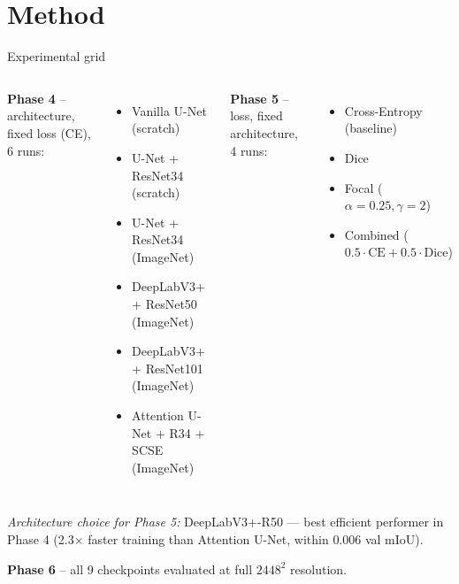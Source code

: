 \documentclass[aspectratio=169,12pt,xcolor={table}]{beamer}
\begin{document}
\section{Method}

\begin{frame}{Experimental grid}
  \footnotesize
  \begin{columns}[T]
  \textbf{Phase 4} -- architecture, fixed loss (CE), 6 runs:
  \begin{itemize}
    \setlength{\itemsep}{0.15em}
    \item Vanilla U-Net (scratch)
    \item U-Net + ResNet34 (scratch)
    \item U-Net + ResNet34 (ImageNet)
    \item DeepLabV3+ + ResNet50 (ImageNet)
    \item DeepLabV3+ + ResNet101 (ImageNet)
    \item Attention U-Net + R34 + SCSE (ImageNet)
  \end{itemize}

  \textbf{Phase 5} -- loss, fixed architecture, 4 runs:
  \begin{itemize}
    \setlength{\itemsep}{0.15em}
    \item Cross-Entropy (baseline)
    \item Dice
    \item Focal ($\alpha{=}0.25,\gamma{=}2$)
    \item Combined ($0.5\cdot\text{CE} + 0.5\cdot\text{Dice}$)
  \end{itemize}
  \end{columns}

  \vspace{0.7em}
  \emph{Architecture choice for Phase 5:} DeepLabV3+-R50 --- best efficient
  performer in Phase 4 (2.3$\times$ faster training than Attention U-Net,
  within $0.006$ val mIoU).

  \vspace{0.4em}
  \textbf{Phase 6} -- all 9 checkpoints evaluated at full $2448^2$ resolution.
\end{frame}
\end{document}
